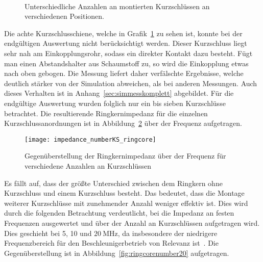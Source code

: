 \begin{figure}[htb]
	\centering
	\hspace{0.0065\textwidth}
	\hspace{0.0065\textwidth}
	\hspace{0.0065\textwidth}
	\\
	\hspace{0.0065\textwidth}
	\hspace{0.0065\textwidth}
	\hspace{0.0065\textwidth}
	\caption{Unterschiedliche Anzahlen an montierten Kurzschl\"ussen an verschiedenen Positionen.}
	\label{fig:ringcorenumberCST}
\end{figure}

Die achte Kurzschlusschiene, welche in Grafik~\ref{fig:ringcorenumberCST} zu sehen ist, konnte bei der endg\"ultigen Auswertung nicht ber\"ucksichtigt werden. Dieser Kurzschluss liegt sehr nah am Einkopplungsrohr, sodass ein direkter Kontakt dazu besteht. F\"ugt man einen Abstandshalter aus Schaumstoff zu, so wird die Einkopplung etwas nach oben gebogen. Die Messung liefert daher verf\"alschte Ergebnisse, welche deutlich st\"arker von der Simulation abweichen, als bei anderen Messungen. Auch dieses Verhalten ist in Anhang~\ref{sec:simmesskomplett} abgebildet. F\"ur die endg\"ultige Auswertung wurden folglich nur ein bis sieben Kurzschl\"usse betrachtet. Die resultierende Ringkernimpedanz f\"ur die einzelnen Kurzschlussanordnungen ist in Abbildung~\ref{fig:ringcorenumber} \"uber der Frequenz aufgetragen.


\newpage

\begin{figure}[htb]
	\centering
	\texttt{[image: impedance\_numberKS\_ringcore]}
	\caption{Gegen\"uberstellung der Ringkernimpedanz \"uber der Frequenz f\"ur verschiedene Anzahlen an Kurzschl\"ussen}
	\label{fig:ringcorenumber}
\end{figure}

Es f\"allt auf, dass der gr\"o\ss{}te Unterschied zwischen dem Ringkern ohne Kurzschluss und einem Kurzschluss besteht. Das bedeutet, dass die Montage weiterer Kurzschl\"usse mit zunehmender Anzahl weniger effektiv ist. Dies wird durch die folgenden Betrachtung verdeutlicht, bei die Impedanz an festen Frequenzen ausgewertet und \"uber der Anzahl an Kurzschl\"ussen aufgetragen wird. Dies geschieht bei 5, 10 und $\SI{20}{\mega\hertz}$, da insbesondere der niedrigere Frequenzbereich f\"ur den Beschleunigerbetrieb von Relevanz ist~\citep{frey2015status}. Die Gegen\"uberstellung ist in Abbildung~\ref{fig:ringcorenumber20} aufgetragen.


